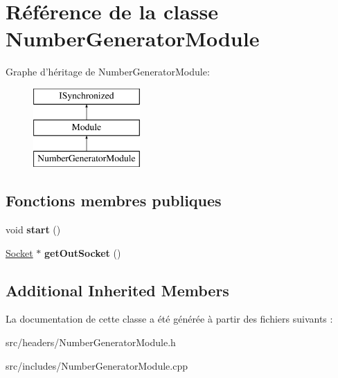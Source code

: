 \hypertarget{classNumberGeneratorModule}{\section{Référence de la classe Number\-Generator\-Module}
\label{classNumberGeneratorModule}
}
Graphe d'héritage de Number\-Generator\-Module\-:\begin{figure}[H]
\begin{center}
\leavevmode
\includegraphics[height=3.000000cm]{classNumberGeneratorModule}
\end{center}
\end{figure}
\subsection*{Fonctions membres publiques}
\begin{DoxyCompactItemize}
\item 
\hypertarget{classNumberGeneratorModule_a92587409c57409b1aae930e37273959d}{void {\bfseries start} ()}\label{classNumberGeneratorModule_a92587409c57409b1aae930e37273959d}

\item 
\hypertarget{classNumberGeneratorModule_ae6d73ee8e66db56e83b01e86b70db9c1}{\hyperlink{classSocket}{Socket} $\ast$ {\bfseries get\-Out\-Socket} ()}\label{classNumberGeneratorModule_ae6d73ee8e66db56e83b01e86b70db9c1}

\end{DoxyCompactItemize}
\subsection*{Additional Inherited Members}


La documentation de cette classe a été générée à partir des fichiers suivants \-:\begin{DoxyCompactItemize}
\item 
src/headers/Number\-Generator\-Module.\-h\item 
src/includes/Number\-Generator\-Module.\-cpp\end{DoxyCompactItemize}
